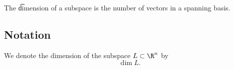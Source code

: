 


The \t{dimension} of a subspace is the number of vectors in a spanning basis.

\subsection{Notation}

We denote the dimension of the subspace $L \subset \R^n$ by
$$
  \dim L.
$$
